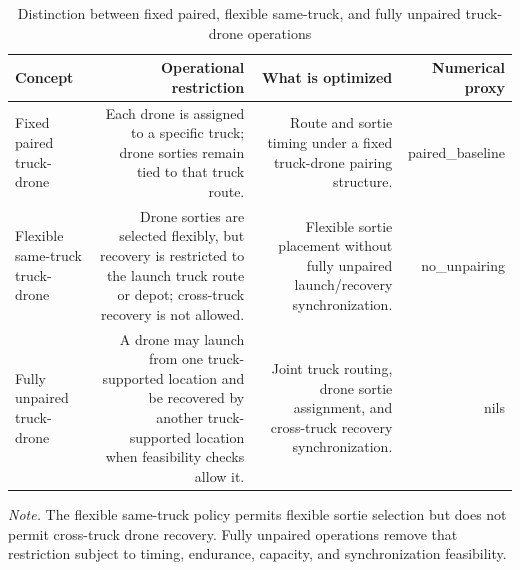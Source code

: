 \begin{table}[!htbp]
\centering
\caption{Distinction between fixed paired, flexible same-truck, and fully unpaired truck-drone operations}
\label{tab:unpairing_definitions}
\begin{tabular}{lrrr}
\toprule
Concept & Operational restriction & What is optimized & Numerical proxy \\
\midrule
Fixed paired truck-drone & Each drone is assigned to a specific truck; drone sorties remain tied to that truck route. & Route and sortie timing under a fixed truck-drone pairing structure. & paired\_baseline \\
Flexible same-truck truck-drone & Drone sorties are selected flexibly, but recovery is restricted to the launch truck route or depot; cross-truck recovery is not allowed. & Flexible sortie placement without fully unpaired launch/recovery synchronization. & no\_unpairing \\
Fully unpaired truck-drone & A drone may launch from one truck-supported location and be recovered by another truck-supported location when feasibility checks allow it. & Joint truck routing, drone sortie assignment, and cross-truck recovery synchronization. & nils \\
\bottomrule
\end{tabular}
\vspace{2pt}
\parbox{\linewidth}{\footnotesize \emph{Note.} The flexible same-truck policy permits flexible sortie selection but does not permit cross-truck drone recovery. Fully unpaired operations remove that restriction subject to timing, endurance, capacity, and synchronization feasibility.}
\end{table}
